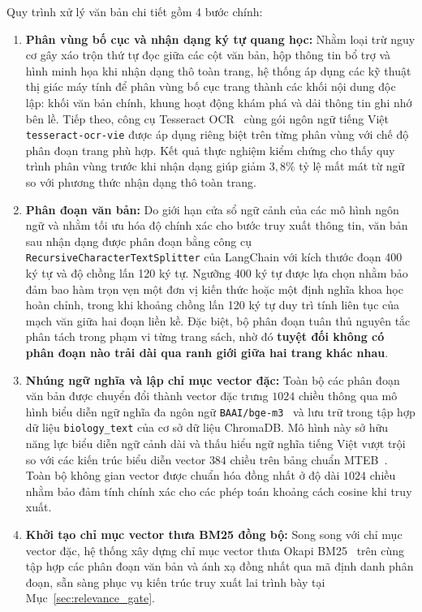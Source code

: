 Quy trình xử lý văn bản chi tiết gồm 4 bước chính:
\begin{enumerate}
    \item \textbf{Phân vùng bố cục và nhận dạng ký tự quang học:} Nhằm loại trừ nguy cơ gây xáo trộn thứ tự đọc giữa các cột văn bản, hộp thông tin bổ trợ và hình minh họa khi nhận dạng thô toàn trang, hệ thống áp dụng các kỹ thuật thị giác máy tính để phân vùng bố cục trang thành các khối nội dung độc lập: khối văn bản chính, khung hoạt động khám phá và dải thông tin ghi nhớ bên lề. Tiếp theo, công cụ Tesseract OCR~\cite{smith2007tesseract} cùng gói ngôn ngữ tiếng Việt \texttt{tesseract-ocr-vie} được áp dụng riêng biệt trên từng phân vùng với chế độ phân đoạn trang phù hợp. Kết quả thực nghiệm kiểm chứng cho thấy quy trình phân vùng trước khi nhận dạng giúp giảm $3{,}8\%$ tỷ lệ mất mát từ ngữ so với phương thức nhận dạng thô toàn trang.
    \item \textbf{Phân đoạn văn bản:} Do giới hạn cửa sổ ngữ cảnh của các mô hình ngôn ngữ và nhằm tối ưu hóa độ chính xác cho bước truy xuất thông tin, văn bản sau nhận dạng được phân đoạn bằng công cụ \texttt{RecursiveCharacterTextSplitter} của LangChain với kích thước đoạn 400 ký tự và độ chồng lấn 120 ký tự. Ngưỡng 400 ký tự được lựa chọn nhằm bảo đảm bao hàm trọn vẹn một đơn vị kiến thức hoặc một định nghĩa khoa học hoàn chỉnh, trong khi khoảng chồng lấn 120 ký tự duy trì tính liên tục của mạch văn giữa hai đoạn liền kề. Đặc biệt, bộ phân đoạn tuân thủ nguyên tắc phân tách trong phạm vi từng trang sách, nhờ đó \textbf{tuyệt đối không có phân đoạn nào trải dài qua ranh giới giữa hai trang khác nhau}.
    \item \textbf{Nhúng ngữ nghĩa và lập chỉ mục vector đặc:} Toàn bộ các phân đoạn văn bản được chuyển đổi thành vector đặc trưng $1024$ chiều thông qua mô hình biểu diễn ngữ nghĩa đa ngôn ngữ \texttt{BAAI/bge-m3}~\cite{chen2024bgem3} và lưu trữ trong tập hợp dữ liệu \texttt{biology\_text} của cơ sở dữ liệu ChromaDB. Mô hình này sở hữu năng lực biểu diễn ngữ cảnh dài và thấu hiểu ngữ nghĩa tiếng Việt vượt trội so với các kiến trúc biểu diễn vector $384$ chiều trên bảng chuẩn MTEB~\cite{muennighoff2022mteb}. Toàn bộ không gian vector được chuẩn hóa đồng nhất ở độ dài $1024$ chiều nhằm bảo đảm tính chính xác cho các phép toán khoảng cách cosine khi truy xuất.
    \item \textbf{Khởi tạo chỉ mục vector thưa BM25 đồng bộ:} Song song với chỉ mục vector đặc, hệ thống xây dựng chỉ mục vector thưa Okapi BM25~\cite{robertson2009bm25} trên cùng tập hợp các phân đoạn văn bản và ánh xạ đồng nhất qua mã định danh phân đoạn, sẵn sàng phục vụ kiến trúc truy xuất lai trình bày tại Mục~\ref{sec:relevance_gate}.
\end{enumerate}

